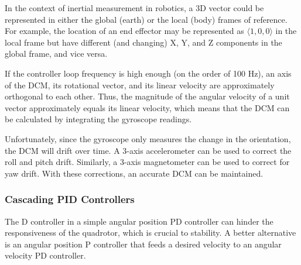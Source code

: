 \documentclass[12pt,letterpaper]{article}
\begin{document}
In the context of inertial measurement in robotics, a 3D vector could be
represented in either the global (earth) or the local (body) frames of
reference. For example, the location of an end effector may be represented as
$\langle1, 0, 0\rangle$ in the local frame but have different (and changing) X,
Y, and Z components in the global frame, and vice versa.

If the controller loop frequency is high enough (on the order of 100 Hz), an
axis of the DCM, its rotational vector, and its linear velocity are
approximately orthogonal to each other. Thus, the magnitude of the angular
velocity of a unit vector approximately equals its linear velocity, which means
that the DCM can be calculated by integrating the gyroscope readings.

Unfortunately, since the gyroscope only measures the change in the orientation,
the DCM will drift over time. A 3-axis accelerometer can be used to correct the
roll and pitch drift. Similarly, a 3-axis magnetometer can be used to correct
for yaw drift. With these corrections, an accurate DCM can be maintained.





\subsubsection*{Cascading PID Controllers}

The D controller in a simple angular position PD controller can hinder the
responsiveness of the quadrotor, which is crucial to stability. A better
alternative is an angular position P controller that feeds a desired velocity
to an angular velocity PD controller.
\end{document}
